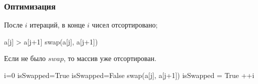 \begin{multicols}{2}
    \subsubsection*{Оптимизация}
    \begin{enumerate*}
        \item После $i$ итераций, в конце $i$ чисел отсортировано;
        \begin{algorithmic}[1]
            \If a[j] > a[j+1]
            \State swap(a[j], a[j+1])
            \EndIf
            \EndFor
            \EndFor
            \EndFunction
        \end{algorithmic}
        \item Если не было $swap$, то массив уже отсортирован.
        \begin{algorithmic}[1]
            \State i=0
            \State isSwapped=True
            \State isSwapped=False
            \State swap(a[j], a[j+1])
            \State isSwapped = True
            \EndIf
            \EndFor
            \State ++i
            \EndWhile
            \EndFunction
        \end{algorithmic}
    \end{enumerate*}


\end{multicols}
